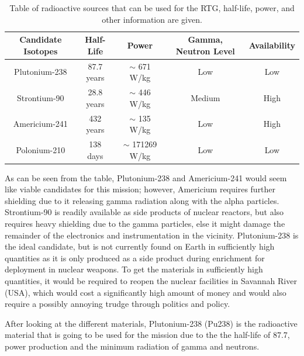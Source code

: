 \begin{table}[h!]
	\begin{tabular}{c|c|c|c|c}
		Candidate Isotopes & Half-Life & Power & Gamma, Neutron Level & Availability\\
		\hline
		Plutonium-238 & 87.7 years & $\sim$ 671 W/kg & Low & Low\\
		Strontium-90 & 28.8 years & $\sim$ 446 W/kg & Medium & High\\
		Americium-241 & 432 years & $\sim$ 135 W/kg & Low & High\\
		Polonium-210 & 138 days & $\sim$ 171269 W/kg & Low & Low\\
	\end{tabular}
	\caption{Table of radioactive sources that can be used for the RTG, half-life, power, and other information are given. \label{tab:isotopes}}
\end{table}

As can be seen from the table, Plutonium-238 and Americium-241 would seem like viable candidates for this mission; however, Americium requires further shielding due to it releasing gamma radiation along with the alpha particles. Strontium-90 is readily available as side products of nuclear reactors, but also requires heavy shielding due to the gamma particles, else it might damage the remainder of the electronics and instrumentation in the vicinity. Plutonium-238 is the ideal candidate, but is not currently found on Earth in sufficiently high quantities as it is only produced as a side product during enrichment for deployment in nuclear weapons. To get the materials in sufficiently high quantities, it would be required to reopen the nuclear facilities in Savannah River (USA), which would cost a significantly high amount of money and would also require a possibly annoying trudge through politics and policy.

\label{sec:plutonium}
After looking at the different materials, Plutonium-238 (Pu238) is the radioactive material that is going to be used for the mission due to the the half-life of 87.7, power production and the minimum radiation of gamma and neutrons. 

